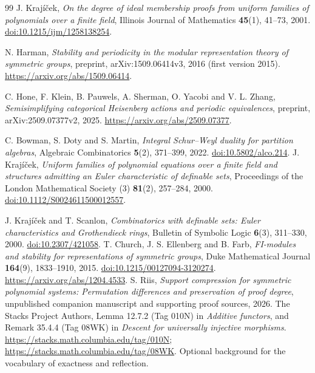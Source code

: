 \begin{thebibliography}{99}
J. Kraj\'i\v cek, \emph{On the degree of ideal membership proofs from uniform
families of polynomials over a finite field}, Illinois Journal of
Mathematics \textbf{45}(1), 41--73, 2001.
\href{https://doi.org/10.1215/ijm/1258138254}{doi:10.1215/ijm/1258138254}.

N. Harman, \emph{Stability and periodicity in the modular representation
theory of symmetric groups}, preprint, arXiv:1509.06414v3, 2016 (first version 2015).
\url{https://arxiv.org/abs/1509.06414}.

C. Hone, F. Klein, B. Pauwels, A. Sherman, O. Yacobi and V. L. Zhang,
\emph{Semisimplifying categorical Heisenberg actions and periodic equivalences}, preprint,
arXiv:2509.07377v2, 2025.
\url{https://arxiv.org/abs/2509.07377}.

C. Bowman, S. Doty and S. Martin, \emph{Integral Schur--Weyl duality for
partition algebras}, Algebraic Combinatorics \textbf{5}(2), 371--399, 2022.
\href{https://doi.org/10.5802/alco.214}{doi:10.5802/alco.214}.
J. Kraj\'i\v cek, \emph{Uniform families of polynomial equations over a
finite field and structures admitting an Euler characteristic of definable
sets}, Proceedings of the London Mathematical Society (3)
\textbf{81}(2), 257--284, 2000.
\href{https://doi.org/10.1112/S0024611500012557}{doi:10.1112/S0024611500012557}.

J. Kraj\'i\v cek and T. Scanlon, \emph{Combinatorics with definable sets:
Euler characteristics and Grothendieck rings}, Bulletin of Symbolic Logic
\textbf{6}(3), 311--330, 2000.
\href{https://doi.org/10.2307/421058}{doi:10.2307/421058}.
T. Church, J. S. Ellenberg and B. Farb,
\emph{FI-modules and stability for representations of symmetric groups},
Duke Mathematical Journal \textbf{164}(9), 1833--1910, 2015.
\href{https://doi.org/10.1215/00127094-3120274}{doi:10.1215/00127094-3120274}.
\url{https://arxiv.org/abs/1204.4533}.
S. Riis, \emph{Support compression for symmetric polynomial systems:
Permutation differences and preservation of proof degree},
unpublished companion manuscript and supporting proof sources, 2026.
The Stacks Project Authors,
Lemma 12.7.2 (Tag 010N) in \emph{Additive functors}, and
Remark 35.4.4 (Tag 08WK) in \emph{Descent for universally injective morphisms}.
\url{https://stacks.math.columbia.edu/tag/010N};
\url{https://stacks.math.columbia.edu/tag/08WK}.
Optional background for the vocabulary of exactness and reflection.


\end{thebibliography}

